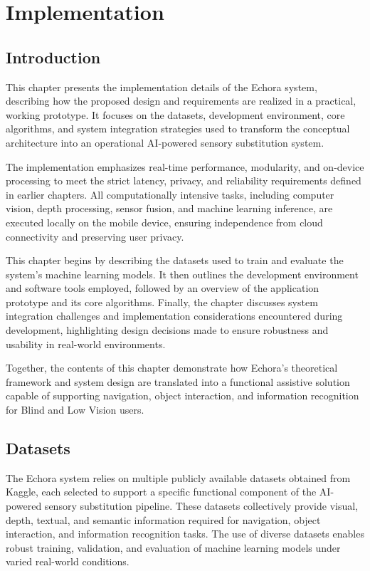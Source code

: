 \chapter{Implementation}

\section{Introduction}
This chapter presents the implementation details of the Echora system, describing how the
proposed design and requirements are realized in a practical, working prototype. It focuses
on the datasets, development environment, core algorithms, and system integration strategies
used to transform the conceptual architecture into an operational AI-powered sensory
substitution system.

The implementation emphasizes real-time performance, modularity, and on-device processing
to meet the strict latency, privacy, and reliability requirements defined in earlier chapters.
All computationally intensive tasks, including computer vision, depth processing, sensor
fusion, and machine learning inference, are executed locally on the mobile device, ensuring
independence from cloud connectivity and preserving user privacy.

This chapter begins by describing the datasets used to train and evaluate the system’s machine
learning models. It then outlines the development environment and software tools employed,
followed by an overview of the application prototype and its core algorithms. Finally, the
chapter discusses system integration challenges and implementation considerations encountered
during development, highlighting design decisions made to ensure robustness and usability in
real-world environments.

Together, the contents of this chapter demonstrate how Echora’s theoretical framework and
system design are translated into a functional assistive solution capable of supporting
navigation, object interaction, and information recognition for Blind and Low Vision users.


\section{Datasets}

The Echora system relies on multiple publicly available datasets obtained from Kaggle, each
selected to support a specific functional component of the AI-powered sensory substitution
pipeline. These datasets collectively provide visual, depth, textual, and semantic information
required for navigation, object interaction, and information recognition tasks. The use of
diverse datasets enables robust training, validation, and evaluation of machine learning models
under varied real-world conditions.

